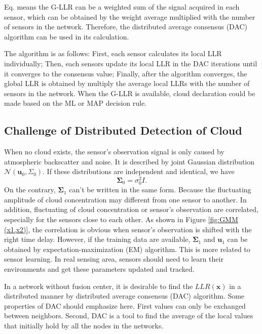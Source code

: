 Eq. means the G-LLR can be a weighted
sum of the signal acquired in each sensor, which can be obtained by
the weight average multiplied with the number of sensors in the network.
Therefore, the distributed average consensus (DAC) algorithm can be
used in its calculation. 

The algorithm is as follows: First, each sensor calculates its local
LLR individually; Then, each sensors update its local LLR in the DAC
iterations until it converges to the consensus value; Finally, after
the algorithm converges, the global LLR is obtained by multiply the
average local LLRs with the number of sensors in the network. When
the G-LLR is available, cloud declaration could be made based on the
ML or MAP decision rule.


\subsection{Challenge of Distributed Detection of Cloud}

When no cloud exists, the sensor's observation signal is only caused
by atmospheric backscatter and noise. It is described by joint Gaussian
distribution $\mathcal{N}\left(\mathbf{u}_{0},\Sigma_{0}\right)$.
If these distributions are independent and identical, we have 
\begin{equation}
\mathbf{\Sigma}_{0}=\sigma_{0}^{2}I.
\end{equation}
On the contrary, $\mathbf{\Sigma}_{1}$ can't be written in the same
form. Because the fluctuating amplitude of cloud concentration may
different from one sensor to another. In addition, fluctuating of
cloud concentration or sensor's observation are correlated, especially
for the sensors close to each other. As shown in Figure \ref{fig:GMM (x1,x2)},
the correlation is obvious when sensor's observation is shifted with
the right time delay. However, if the training data are available,
$\mathbf{\Sigma}_{1}$ and $\mathbf{u}_{1}$ can be obtained by expectation-maximization
(EM) algorithm. This is more related to sensor learning. In real sensing
area, sensors should need to learn their environments and get these
parameters updated and tracked. 

In a network without fusion center, it is desirable to find the $LLR(\mathbf{x})$
in a distributed manner by distributed average consensus (DAC) algorithm.
Some properties of DAC should emphasize here. First values can only
be exchanged between neighbors. Second, DAC is a tool to find the
average of the local values that initially hold by all the nodes in
the networks. 

